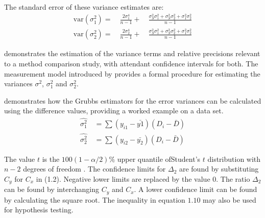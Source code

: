 \documentclass[12pt, a4paper]{report}
\theoremstyle{plain}
\theoremstyle{definition}
\theoremstyle{remark}
\begin{document}
	
	The standard error of these variance estimates are:
	\begin{eqnarray}
	\textrm{var}(\sigma^{2}_{1}) =\quad \frac{2\sigma^{4}_{1}}{n-1} +\quad
	\frac{\sigma^2_{S}\sigma^2_{1}+\sigma^2_{S}\sigma^2_{2}+\sigma^2_{1}\sigma^2_{2}
	}{n-1}\\
	\textrm{var}(\sigma^{2}_{2}) =\quad \frac{2\sigma^{4}_{2}}{n-1} +\quad
	\frac{\sigma^2_{S}\sigma^2_{1}+\sigma^2_{S}\sigma^2_{2}+\sigma^2_{1}\sigma^2_{2}
	}{n-1}\nonumber
	\end{eqnarray}
	
	\citet{Kinsella} demonstrates the estimation of the variance terms and relative precisions relevant to a method comparison study, with attendant confidence intervals for both. The measurement model introduced by \citet{Grubbs48,Grubbs73} provides a formal procedure for estimating the variances $\sigma^2$, $\sigma^2_{1}$ and $\sigma^2_{2}$. 
	
	
	\citet{kinsella} demonstrates how the Grubbs estimators for the
	error variances can be calculated using the difference values,
	providing a worked example on a data set.
	\begin{eqnarray}
	\hat{\sigma^{2}_{1}}
	\quad=\sum{(y_{i1}-\bar{y{1}})(D_{i}-\bar{D})}\\
	\hat{\sigma^{2}_{2}} \quad=
	\sum{(y_{i2}-\bar{y_{2}})(D_{i}-\bar{D})} \nonumber
	\end{eqnarray}
	
	The value $t$ is the $100(1-\alpha/2)\%$ upper quantile ofStudent's $t$ distribution with $n-2$ degrees of freedom \citep{Kinsella}. The confidence limits for $\Delta_{2}$ are found by substituting $C_{y}$ for $C_{x}$ in (1.2).
	Negative lower limits are replaced by the value $0$. The ratio $\Delta_{2}$
	can be found by interchanging $C_{y}$ and $C_{x}$. A lower confidence limit can be found by calculating the square root. The inequality in equation $1.10$ may also be used for hypothesis testing.
	
\end{document}
